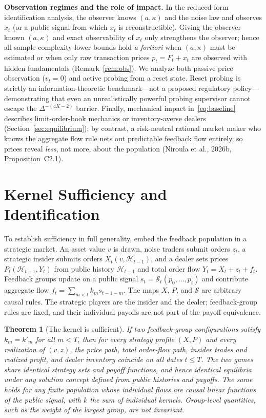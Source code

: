 \documentclass[11pt,letterpaper]{article}
\newtheorem{theorem}{Theorem}[section]
\theoremstyle{definition}
\begin{document}
\textbf{Observation regimes and the role of impact.} In the reduced-form identification analysis, the observer knows $(a, \kappa)$ and the noise law and observes $x_t$ (or a public signal from which $x_t$ is reconstructible). Giving the observer known $(a, \kappa)$ and exact observability of $x_t$ only strengthens the observer; hence all sample-complexity lower bounds hold \emph{a fortiori} when $(a, \kappa)$ must be estimated or when only raw transaction prices $p_t = F_t + x_t$ are observed with hidden fundamentals (Remark~\ref{rem:obs}). We analyze both passive price observation ($v_t = 0$) and active probing from a reset state. Reset probing is strictly an information-theoretic benchmark—not a proposed regulatory policy—demonstrating that even an unrealistically powerful probing supervisor cannot escape the $\Delta^{-(4K-2)}$ barrier. Finally, mechanical impact in~\eqref{eq:baseline} describes limit-order-book mechanics or inventory-averse dealers (Section~\ref{sec:equilibrium}); by contrast, a risk-neutral rational market maker who knows the aggregate flow rule nets out predictable feedback flow entirely, so prices reveal \emph{less}, not more, about the population (Niroula et al., 2026b, Proposition~C2.1).

\section{Kernel Sufficiency and Identification}\label{sec:sufficiency}

To establish sufficiency in full generality, embed the feedback population in a strategic market. An asset value $v$ is drawn, noise traders submit orders $z_t$, a strategic insider submits orders $X_t(v, \mathcal{H}_{t-1})$, and a dealer sets prices $P_t(\mathcal{H}_{t-1}, Y_t)$ from public history $\mathcal{H}_{t-1}$ and total order flow $Y_t = X_t + z_t + f_t$. Feedback groups update on a public signal $s_t = \mathcal{S}_t(p_0, \dots, p_t)$ and contribute aggregate flow $f_t = \sum_{m < t} k_m s_{t-1-m}$. The maps $X$, $P$, and $\mathcal{S}$ are arbitrary causal rules. The strategic players are the insider and the dealer; feedback-group rules are fixed, and their individual payoffs are not part of the payoff equivalence.

\begin{theorem}[The kernel is sufficient]\label{thm:sufficiency}
If two feedback-group configurations satisfy $k_m = k'_m$ for all $m < T$, then for every strategy profile $(X, P)$ and every realization of $(v, z)$, the price path, total order-flow path, insider trades and realized profit, and dealer inventory coincide on all dates $t \le T$. The two games share identical strategy sets and payoff functions, and hence identical equilibria under any solution concept defined from public histories and payoffs. The same holds for any finite population whose individual flows are causal linear functions of the public signal, with $k$ the sum of individual kernels. Group-level quantities, such as the weight of the largest group, are not invariant.
\end{theorem}
\end{document}
